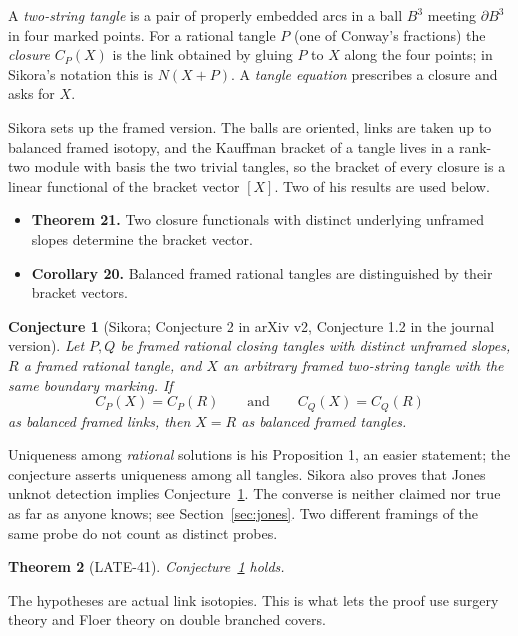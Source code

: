 \documentclass[11pt]{amsart}
\newtheorem{theorem}{Theorem}[section]
\newtheorem{conjecture}[theorem]{Conjecture}
\theoremstyle{remark}
\begin{document}
A \emph{two-string tangle} is a pair of properly embedded arcs in a ball $B^3$ meeting $\partial B^3$ in four marked points. For a rational tangle $P$ (one of Conway's fractions) the \emph{closure} $C_P(X)$ is the link obtained by gluing $P$ to $X$ along the four points; in Sikora's notation this is $N(X+P)$. A \emph{tangle equation} prescribes a closure and asks for $X$.

Sikora \cite{Sikora} sets up the framed version. The balls are oriented, links are taken up to balanced framed isotopy, and the Kauffman bracket of a tangle lives in a rank-two module with basis the two trivial tangles, so the bracket of every closure is a linear functional of the bracket vector $[X]$. Two of his results are used below.

\begin{itemize}
\item \textbf{Theorem 21.} Two closure functionals with distinct underlying unframed slopes determine the bracket vector.
\item \textbf{Corollary 20.} Balanced framed rational tangles are distinguished by their bracket vectors.
\end{itemize}

\begin{conjecture}[Sikora; Conjecture 2 in arXiv v2, Conjecture 1.2 in the journal version]\label{conj:sikora}
Let $P,Q$ be framed rational closing tangles with distinct unframed slopes, $R$ a framed rational tangle, and $X$ an arbitrary framed two-string tangle with the same boundary marking. If
\[
C_P(X)=C_P(R)\qquad\text{and}\qquad C_Q(X)=C_Q(R)
\]
as balanced framed links, then $X=R$ as balanced framed tangles.
\end{conjecture}

Uniqueness among \emph{rational} solutions is his Proposition 1, an easier statement; the conjecture asserts uniqueness among all tangles. Sikora also proves that Jones unknot detection implies Conjecture~\ref{conj:sikora}. The converse is neither claimed nor true as far as anyone knows; see Section~\ref{sec:jones}. Two different framings of the same probe do not count as distinct probes.

\begin{theorem}[LATE-41]\label{thm:main}
Conjecture~\ref{conj:sikora} holds.
\end{theorem}

The hypotheses are actual link isotopies. This is what lets the proof use surgery theory and Floer theory on double branched covers.
\end{document}
